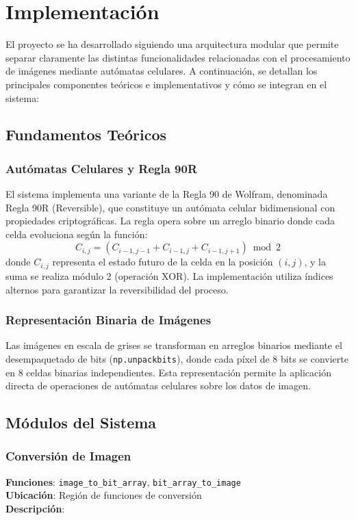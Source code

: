\chapter{Implementaci\'on}
El proyecto se ha desarrollado siguiendo una arquitectura modular que permite separar claramente las distintas funcionalidades relacionadas con el procesamiento de im\'agenes mediante aut\'omatas celulares. A continuaci\'on, se detallan los principales componentes te\'oricos e implementativos y c\'omo se integran en el sistema:

\section{Fundamentos Te\'oricos}
\subsection{Aut\'omatas Celulares y Regla 90R}
El sistema implementa una variante de la Regla 90 de Wolfram, denominada Regla 90R (Reversible), que constituye un aut\'omata celular bidimensional con propiedades criptogr\'aficas. La regla opera sobre un arreglo binario donde cada celda evoluciona seg\'un la funci\'on:
\begin{equation}
C_{i,j} = (C_{i-1,j-1} + C_{i-1,j} + C_{i-1,j+1}) \bmod 2
\end{equation}
donde $C_{i,j}$ representa el estado futuro de la celda en la posici\'on $(i,j)$, y la suma se realiza m\'odulo 2 (operaci\'on XOR). La implementaci\'on utiliza \'indices alternos para garantizar la reversibilidad del proceso.

\subsection{Representaci\'on Binaria de Im\'agenes}
Las im\'agenes en escala de grises se transforman en arreglos binarios mediante el desempaquetado de bits (\texttt{np.unpackbits}), donde cada p\'ixel de 8 bits se convierte en 8 celdas binarias independientes. Esta representaci\'on permite la aplicaci\'on directa de operaciones de aut\'omatas celulares sobre los datos de imagen.

\section{M\'odulos del Sistema}
\subsection{Conversi\'on de Imagen}
\textbf{Funciones}: \texttt{image\_to\_bit\_array}, \texttt{bit\_array\_to\_image}\\
\textbf{Ubicaci\'on}: Regi\'on de funciones de conversi\'on\\
\textbf{Descripci\'on}:


